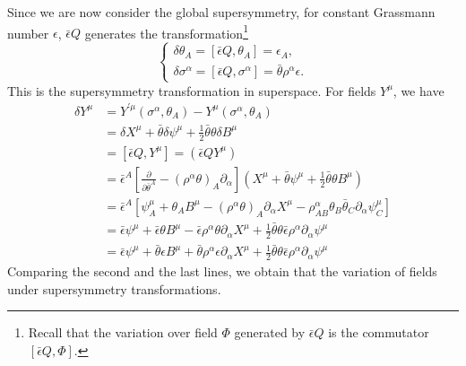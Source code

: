 \documentclass[graybox,envcountchap,sectrefs]{svmono}
\begin{document}
Since we are now consider the global supersymmetry, for constant Grassmann number $\epsilon$, $\bar{\epsilon}Q$ generates the transformation\footnote{Recall that the variation over field $\Phi$ generated by $\bar{\epsilon}Q$ is the commutator $[\bar{\epsilon}Q,\Phi]$.}
\begin{equation}
	\begin{cases}
\delta\theta_A =[\bar{\epsilon}Q,\theta_A]=\epsilon_A, \\
\delta \sigma^{\alpha}=[\bar{\epsilon}Q,\sigma^{\alpha}]=\bar{\theta}\rho^{\alpha}\epsilon.
   \end{cases}
\end{equation}
This is the supersymmetry transformation in superspace.
For fields $Y^{\mu}$, we have
\begin{equation}
\begin{aligned}
\delta Y^{\mu} &=Y^{\prime \mu}\left(\sigma^{\alpha}, \theta_{A}\right)-Y^{\mu}\left(\sigma^{\alpha}, \theta_{A}\right) \\
&=\delta X^{\mu}+\bar{\theta} \delta \psi^{\mu}+\frac{1}{2} \bar{\theta} \theta \delta B^{\mu} \\
&=[\bar{\epsilon}Q,Y^{\mu}]=(\bar{\epsilon}QY^{\mu})\\
&=\bar{\epsilon}^{A}\left[\frac{\partial}{\partial \bar{\theta}^{A}}-\left(\rho^{\alpha} \theta\right)_{A} \partial_{\alpha}\right]\left(X^{\mu}+\bar{\theta} \psi^{\mu}+\frac{1}{2} \bar{\theta} \theta B^{\mu}\right) \\
&=\bar{\epsilon}^{A}\left[\psi_{A}^{\mu}+\theta_{A} B^{\mu}-\left(\rho^{\alpha} \theta\right)_{A} \partial_{\alpha} X^{\mu}-\rho_{A B}^{\alpha} \theta_{B} \bar{\theta}_{C} \partial_{\alpha} \psi_{C}^{\mu}\right] \\
&=\bar{\epsilon} \psi^{\mu}+\bar{\epsilon} \theta B^{\mu}-\bar{\epsilon} \rho^{\alpha} \theta \partial_{\alpha} X^{\mu}+\frac{1}{2} \bar{\theta} \theta \bar{\epsilon} \rho^{\alpha} \partial_{\alpha} \psi^{\mu} \\
&=\bar{\epsilon} \psi^{\mu}+\bar{\theta} \epsilon B^{\mu}+\bar{\theta} \rho^{\alpha} \epsilon \partial_{\alpha} X^{\mu}+\frac{1}{2} \bar{\theta} \theta \bar{\epsilon} \rho^{\alpha} \partial_{\alpha} \psi^{\mu}
\end{aligned}
\end{equation}
Comparing the second and the last lines, we obtain that the variation of fields under supersymmetry transformations.
\end{document}
